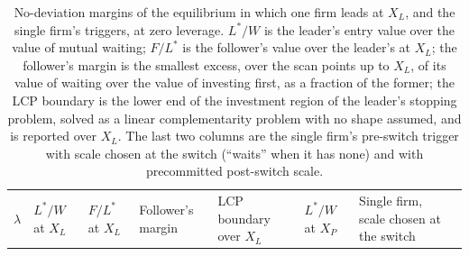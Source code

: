\documentclass[
  11pt,
  letterpaper,
]{scrartcl}
\newcounter{none} %
\begin{document}
\begin{longtable}[]{@{}
  >{\raggedleft\arraybackslash}p{}
  >{\raggedleft\arraybackslash}p{}
  >{\raggedleft\arraybackslash}p{}
  >{\raggedleft\arraybackslash}p{}
  >{\raggedleft\arraybackslash}p{}
  >{\raggedleft\arraybackslash}p{}
  >{\raggedleft\arraybackslash}p{}
  >{\raggedleft\arraybackslash}p{}@{}}
\caption{No-deviation margins of the equilibrium in which one firm leads
at \(X_L\), and the single firm's triggers, at zero leverage. \(L^*/W\)
is the leader's entry value over the value of mutual waiting; \(F/L^*\)
is the follower's value over the leader's at \(X_L\); the follower's
margin is the smallest excess, over the scan points up to \(X_L\), of
its value of waiting over the value of investing first, as a fraction of
the former; the LCP boundary is the lower end of the investment region
of the leader's stopping problem, solved as a linear complementarity
problem with no shape assumed, and is reported over \(X_L\). The last
two columns are the single firm's pre-switch trigger with scale chosen
at the switch (``waits'' when it has none) and with precommitted
post-switch scale.}\label{tbl-duopoly-order}\tabularnewline
\toprule\noalign{}
\begin{minipage}[b]{\linewidth}\raggedleft
\(\lambda\)
\end{minipage} & \begin{minipage}[b]{\linewidth}\raggedleft
\(L^*/W\) at \(X_L\)
\end{minipage} & \begin{minipage}[b]{\linewidth}\raggedleft
\(F/L^*\) at \(X_L\)
\end{minipage} & \begin{minipage}[b]{\linewidth}\raggedleft
Follower's margin
\end{minipage} & \begin{minipage}[b]{\linewidth}\raggedleft
LCP boundary over \(X_L\)
\end{minipage} & \begin{minipage}[b]{\linewidth}\raggedleft
\(L^*/W\) at \(X_P\)
\end{minipage} & \begin{minipage}[b]{\linewidth}\raggedleft
Single firm, scale chosen at the switch

\end{minipage}
\end{longtable}
\end{document}
